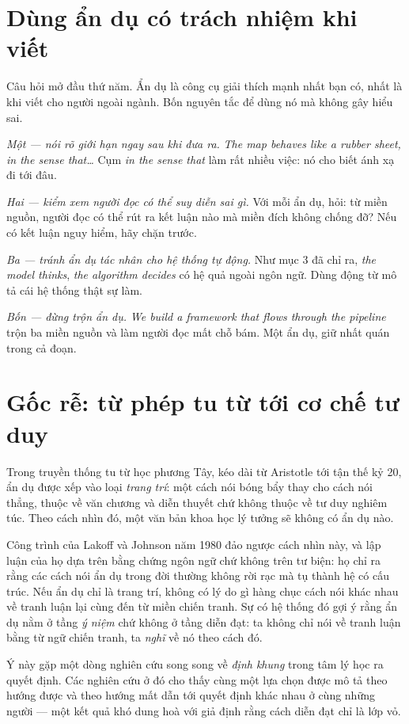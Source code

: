 \documentclass[../../english.tex]{subfiles}
\begin{document}
\section{Dùng ẩn dụ có trách nhiệm khi viết}

Câu hỏi mở đầu thứ năm. Ẩn dụ là công cụ giải thích mạnh nhất bạn có, nhất là khi viết cho người ngoài ngành. Bốn nguyên tắc để dùng nó mà không gây hiểu sai.

\emph{Một --- nói rõ giới hạn ngay sau khi đưa ra.} \emph{The map behaves like a rubber sheet, in the sense that\ldots} Cụm \emph{in the sense that} làm rất nhiều việc: nó cho biết ánh xạ đi tới đâu.

\emph{Hai --- kiểm xem người đọc có thể suy diễn sai gì.} Với mỗi ẩn dụ, hỏi: từ miền nguồn, người đọc có thể rút ra kết luận nào mà miền đích không chống đỡ? Nếu có kết luận nguy hiểm, hãy chặn trước.

\emph{Ba --- tránh ẩn dụ tác nhân cho hệ thống tự động.} Như mục 3 đã chỉ ra, \emph{the model thinks}, \emph{the algorithm decides} có hệ quả ngoài ngôn ngữ. Dùng động từ mô tả cái hệ thống thật sự làm.

\emph{Bốn --- đừng trộn ẩn dụ.} \emph{We build a framework that flows through the pipeline} trộn ba miền nguồn và làm người đọc mất chỗ bám. Một ẩn dụ, giữ nhất quán trong cả đoạn.

\section{Gốc rễ: từ phép tu từ tới cơ chế tư duy}

Trong truyền thống tu từ học phương Tây, kéo dài từ Aristotle tới tận thế kỷ 20, ẩn dụ được xếp vào loại \emph{trang trí}: một cách nói bóng bẩy thay cho cách nói thẳng, thuộc về văn chương và diễn thuyết chứ không thuộc về tư duy nghiêm túc. Theo cách nhìn đó, một văn bản khoa học lý tưởng sẽ không có ẩn dụ nào.

Công trình của Lakoff và Johnson năm 1980\cite{lakoff1980} đảo ngược cách nhìn này, và lập luận của họ dựa trên bằng chứng ngôn ngữ chứ không trên tư biện: họ chỉ ra rằng các cách nói ẩn dụ trong đời thường không rời rạc mà tụ thành hệ có cấu trúc. Nếu ẩn dụ chỉ là trang trí, không có lý do gì hàng chục cách nói khác nhau về tranh luận lại cùng đến từ miền chiến tranh. Sự có hệ thống đó gợi ý rằng ẩn dụ nằm ở tầng \emph{ý niệm} chứ không ở tầng diễn đạt: ta không chỉ nói về tranh luận bằng từ ngữ chiến tranh, ta \emph{nghĩ} về nó theo cách đó.

Ý này gặp một dòng nghiên cứu song song về \emph{định khung} trong tâm lý học ra quyết định. Các nghiên cứu ở đó cho thấy cùng một lựa chọn được mô tả theo hướng được và theo hướng mất dẫn tới quyết định khác nhau ở cùng những người --- một kết quả khó dung hoà với giả định rằng cách diễn đạt chỉ là lớp vỏ.
\end{document}
